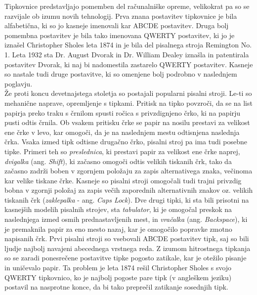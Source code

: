 

  Tipkovnice predstavljajo pomemben del računalniške opreme, velikokrat pa so se razvijale ob izumu novih tehnologij.
  Prva znana postavitev tipkovnice je bila alfabetična, ki so jo kasneje imenovali kar ABCDE postavitev. \cite{keyboard_history}
  Druga bolj pomembna postavitev je bila tako imenovana QWERTY postavitev, ki jo je iznašel Christopher Sholes leta 1874 in je bila del pisalnega stroja Remington No. 1.
  Leta 1932 sta Dr. August Dvorak in Dr. William Dealey iznašla in patentirala postavitev Dvorak, ki naj bi nadomestila zastarelo QWERTY postavitev.
  Kasneje so nastale tudi druge postavitve, ki so omenjene bolj podrobno v naslednjem poglavju. \\

  Že proti koncu devetnajstega stoletja so postajali popularni pisalni stroji.
  Le-ti so mehanične naprave, opremljenje s tipkami.
  Pritisk na tipko povzroči, da se na list papirja preko traku s črnilom spusti ročica s privzdignjeno črko,
  ki na papirju pusti odtis črnila.
  Ob vsakem pritisku črke se papir na nosilu prestavi za velikost ene črke v levo, kar omogoči, da je na naslednjem mestu odtisnjena naslednja črka.
  Vsaka izmed tipk odtisne drugačno črko, pisalni stroj pa ima tudi posebne tipke.
  Primeri teh so \emph{preslednica}, ki prestavi papir za velikost ene črke naprej,
  \emph{dvigalka} (ang. \emph{Shift}), ki začasno omogoči odtis velikih tiskanih črk, tako da začasno zadrži boben v zgornjem položaju za zapis alternativega znaka, večinoma kar velike tiskane črke.
  Kasneje so pisalni stroji omogočali tudi trajni privzdig bobna v zgornji položaj za zapis večih zaporednih alternativnih znakov oz. velikih tiskanih črk (\emph{zaklepalka} - ang. \emph{Caps Lock}).
  Dve drugi tipki, ki sta bili prisotni na kasnejših modelih pisalnih strojev, sta \emph{tabulator}, ki je omogočal preskok na naslednjega izmed osmih prednastavljenih mest, in
  \emph{vračalka} (ang. \emph{Backspace}), ki je premaknila papir za eno mesto nazaj, kar je omogočilo popravke zmotno napisanih črk.
  Prvi pisalni stroji so vsebovali ABCDE postavitev tipk, saj so bili ljudje najbolj navajeni abecednega vrstnega reda.
  Z izumom hitrostnega tipkanja so se zaradi ponesrečene postavitve tipke pogosto zatikale, kar je otežilo pisanje in uničevalo papir.
  Ta problem je leta 1874 rešil Christopher Sholes s svojo QWERTY tipkovnico, ko je najbolj pogoste pare tipk (v angleškem jeziku) postavil na nasprotne konce,
  da bi tako preprečil zatikanje sosednjih tipk.

